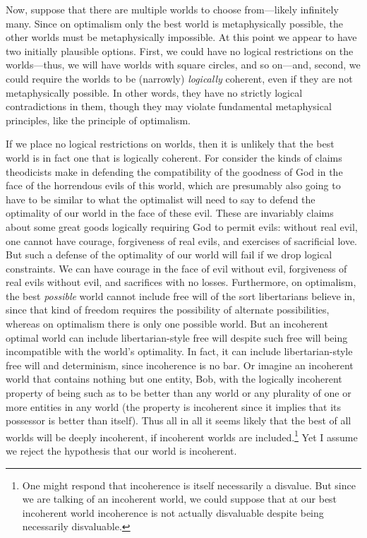 Now, suppose that there are multiple worlds to choose from---likely infinitely many. Since on optimalism only the best world is 
metaphysically possible, the other worlds must be metaphysically impossible. At this point we appear to have two 
initially plausible options. First, we could have no logical restrictions on the worlds---thus, we will have worlds
with square circles, and so on---and, second, we could require the worlds to be (narrowly) \textit{logically} coherent, even if 
they are not metaphysically possible. In other words, they have no strictly logical contradictions in them, though they 
may violate fundamental metaphysical principles, like the principle of optimalism. 

If we place no logical restrictions on worlds, then it is unlikely that the best world is in fact one that is 
logically coherent. For consider the kinds of claims theodicists make in defending the compatibility of 
the goodness of God in the face of the horrendous evils of this world, which are presumably also going to have 
to be similar to what the optimalist will need to say to defend the optimality of our world in the face of these
evil. These are invariably claims about some great goods logically requiring God to permit evils: without real evil,
one cannot have courage, forgiveness of real evils, and exercises of sacrificial love. But such a defense of the 
optimality of our world will fail if we drop logical constraints. We can have courage in the face of evil without evil,
forgiveness of real evils without evil, and sacrifices with no losses. Furthermore, on optimalism, the best 
\textit{possible} world cannot include free will of the sort libertarians believe in, since that kind of freedom
requires the possibility of alternate possibilities, whereas on optimalism there is only one possible world. But an 
incoherent optimal world can include libertarian-style free will despite such free will being incompatible with the
world's optimality. In fact, it can include libertarian-style free will and determinism, since incoherence is no 
bar. Or imagine an incoherent world that contains nothing but one entity, Bob, with the logically incoherent property 
of being such as to be better than any world or any plurality of one or more entities in any world (the property is incoherent
since it implies that its possessor is better than itself). Thus all in all it seems likely that the best of all worlds will be deeply incoherent, if incoherent worlds are
included.\footnote{One might respond that incoherence is itself necessarily a disvalue. But since we are talking of an incoherent world, we could 
suppose that at our best incoherent world incoherence is not actually disvaluable despite being necessarily 
disvaluable.} Yet I assume we reject the hypothesis that our world is incoherent.

